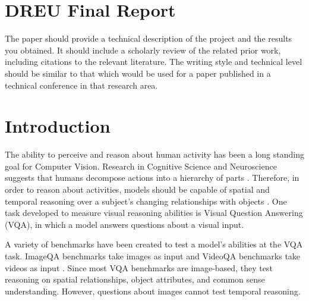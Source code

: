 \documentclass{article}
\newcommand{\mgm}[1]{{\color{cyan}{mgm: #1}}}
\begin{document}
\section*{DREU Final Report}

The paper should provide a technical description of the project and the results you obtained. It should include a scholarly review of the related prior work, including citations to the relevant literature. The writing style and technical level should be similar to that which would be used for a paper published in a technical conference in that research area.

\section{Introduction}


\mgm{High level comment: is this too much or too little detail for an intro? anything else we should include?}

The ability to perceive and reason about human activity has been a long standing goal for Computer Vision. Research in Cognitive Science and Neuroscience suggests that humans decompose actions into a hierarchy of parts \cite{zacks2001events}. Therefore, in order to reason about activities, models should be capable of spatial and temporal reasoning over a subject's changing relationships with objects \cite{ji2020action}. One task developed to measure visual reasoning abilities is Visual Question Answering (VQA), in which a model answers questions about a visual input. 

A variety of benchmarks have been created to test a model's abilities at the VQA task. ImageQA benchmarks take images as input \cite{johnson2017clevr, hudson2019gqa, antol2015vqa, zellers2019recognition, goyal2017making, krishna2017visual, zhu2016visual7w, kim2020answering} and VideoQA benchmarks take videos as input \cite{tapaswi2016movieqa, lei2018tvqa, jang2017tgif, kim2017deepstory, xu2017video, maharaj2017dataset, zeng2016leveraging, yu2019activitynet}. Since most VQA benchmarks are image-based, they test reasoning on spatial relationships, object attributes, and common sense understanding. However, questions about images cannot test temporal reasoning. 
\end{document}
